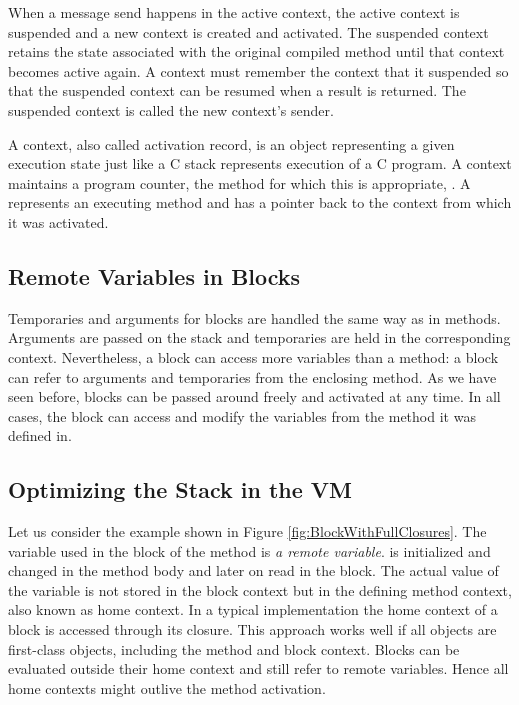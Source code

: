 \documentclass[a4paper,10pt,twoside]{book}
\begin{document}
When a message send happens in the active context, the active context
is suspended and a new context is created and activated. The
suspended context retains the state associated with the original
compiled method until that context becomes active again. A context
must remember the context that it suspended so that the suspended
context can be resumed when a result is returned. The suspended
context is called the new context's sender.

A context, also called activation record, is an object representing a
given execution state just like a C stack represents execution of a C
program. A context maintains a program counter, the method for which
this is appropriate, \etc. A  represents an executing
method and has a pointer back to the context from which it was activated.


\subsection{Remote Variables in Blocks}

Temporaries and arguments for blocks are handled the same way as in methods.
Arguments are passed on the stack and temporaries are held in the corresponding context.
Nevertheless, a block can access more variables than a method:
a block can refer to arguments and temporaries from the enclosing method.
As we have seen before, blocks can be passed around freely and activated at any time.
In all cases, the block can access and modify the variables from the method it was defined in.


\subsection{Optimizing the Stack in the VM}

Let us consider the example shown in Figure \ref{fig:BlockWithFullClosures}.
The  variable used in the block of the  method is \emph{a remote variable}.
 is initialized and changed in the method body and later on read in the block.
The actual value of the variable is not stored in the block context but in the defining method context, also known as home context.
In a typical implementation the home context of a block is accessed through its closure.
This approach works well if all objects are first-class objects, including the method and block context.
Blocks can be evaluated outside their home context and still refer to remote variables.
Hence all home contexts might outlive the method activation.
\end{document}
